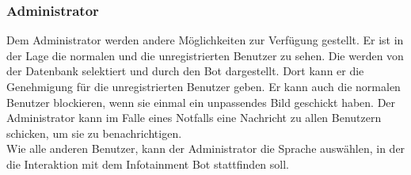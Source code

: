 \subsubsection{Administrator}
Dem Administrator werden andere Möglichkeiten zur Verfügung gestellt. Er ist in der Lage die normalen und die unregistrierten Benutzer zu sehen. Die werden von der Datenbank selektiert und durch den Bot dargestellt. Dort kann er die Genehmigung für die unregistrierten Benutzer geben. Er kann auch die normalen Benutzer blockieren, wenn sie einmal ein unpassendes Bild geschickt haben. Der Administrator kann im Falle eines Notfalls eine Nachricht zu allen Benutzern schicken, um sie zu benachrichtigen. \\
Wie alle anderen Benutzer, kann der Administrator die Sprache auswählen, in der die Interaktion mit dem Infotainment Bot stattfinden soll. 
\\
